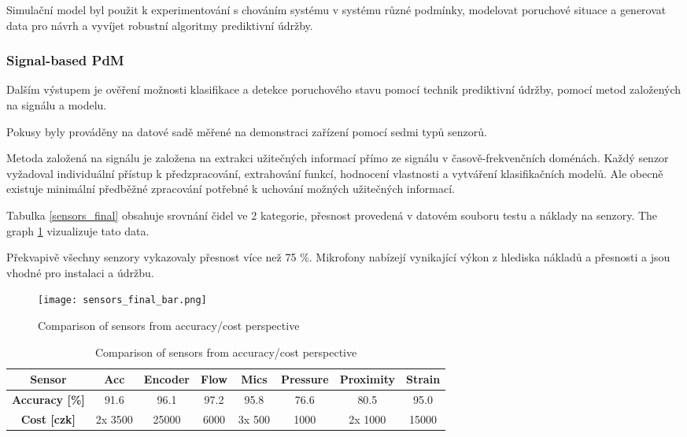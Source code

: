 Simulační model byl použit k experimentování s chováním systému v systému
různé podmínky, modelovat poruchové situace a generovat data pro návrh
a vyvíjet robustní algoritmy prediktivní údržby.


\subsubsection{Signal-based PdM}
Dalším výstupem je ověření možnosti klasifikace a
detekce poruchového stavu pomocí technik prediktivní údržby,
pomocí metod založených na signálu a modelu.
 
Pokusy byly prováděny na datové sadě měřené na demonstraci
zařízení pomocí sedmi typů senzorů.
  
Metoda založená na signálu je založena na extrakci užitečných informací
přímo ze signálu v časově-frekvenčních doménách. Každý senzor vyžadoval
individuální přístup k předzpracování, extrahování funkcí, hodnocení
vlastnosti a vytváření klasifikačních modelů. Ale obecně existuje
minimální předběžné zpracování potřebné k uchování možných užitečných informací.

Tabulka \ref{sensors_final} obsahuje srovnání čidel ve 2
kategorie, přesnost provedená v datovém souboru testu a náklady na senzory. The
graph \ref{fig:sensors_final_bar} vizualizuje tato data.

Překvapivě všechny senzory vykazovaly přesnost více než 75 \%. Mikrofony
nabízejí vynikající výkon z hlediska nákladů a přesnosti a jsou
vhodné pro instalaci a údržbu.

\begin{figure}[h!]
    \centering
    \texttt{[image: sensors\_final\_bar.png]}
    \caption{Comparison of sensors from accuracy/cost perspective}
    \label{fig:sensors_final_bar}
\end{figure}

\begin{table}[h]
    \centering
    \begin{tabular}{|c|c|c|c|c|c|c|c|}
        \hline
        \textbf{Sensor}   & Acc & Encoder & Flow & Mics & Pressure & Proximity & Strain \\
        \hline
        \textbf{Accuracy [\%]} & 91.6 & 96.1 & 97.2 & 95.8 & 76.6 & 80.5 & 95.0 \\
        \hline
        \textbf{Cost [czk]} & 2x 3500 & 25000 & 6000 & 3x 500 & 1000 & 2x 1000 & 15000 \\
        \hline
    \end{tabular}
    \caption{Comparison of sensors from accuracy/cost perspective}
    \label{tab:sensors_final}
\end{table}

